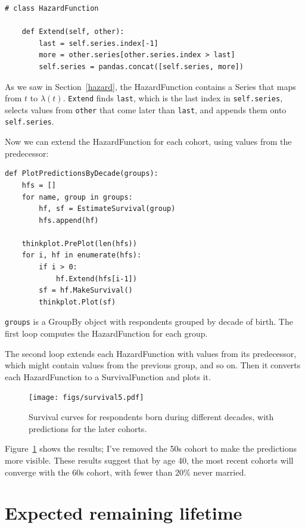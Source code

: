 \documentclass[12pt]{book}
\theoremstyle{exercise}
\begin{document}
\begin{verbatim}
# class HazardFunction

    def Extend(self, other):
        last = self.series.index[-1]
        more = other.series[other.series.index > last]
        self.series = pandas.concat([self.series, more])
\end{verbatim}

As we saw in Section~\ref{hazard}, the HazardFunction contains a Series
that maps from $t$ to $\lambda(t)$.  {\tt Extend} finds {\tt last},
which is the last index in {\tt self.series}, selects values from
{\tt other} that come later than {\tt last}, and appends them
onto {\tt self.series}.%
%

Now we can extend the HazardFunction for each cohort, using values
from the predecessor:

\begin{verbatim}
def PlotPredictionsByDecade(groups):
    hfs = []
    for name, group in groups:
        hf, sf = EstimateSurvival(group)
        hfs.append(hf)

    thinkplot.PrePlot(len(hfs))
    for i, hf in enumerate(hfs):
        if i > 0:
            hf.Extend(hfs[i-1])
        sf = hf.MakeSurvival()
        thinkplot.Plot(sf)
\end{verbatim}

{\tt groups} is a GroupBy object with respondents grouped by decade of
birth.  The first loop computes the HazardFunction for each group.%

The second loop extends each HazardFunction with values from
its predecessor, which might contain values from the previous
group, and so on.  Then it converts each HazardFunction to
a SurvivalFunction and plots it.

\begin{figure}
\centerline{\texttt{[image: figs/survival5.pdf]}}
\caption{Survival curves for respondents born during different decades,
with predictions for the later cohorts.}%
\label{survival5}
\end{figure}

Figure~\ref{survival5} shows the results; I've removed the 50s cohort
to make the predictions more visible.  These results suggest that by
age 40, the most recent cohorts will converge with the 60s cohort,
with fewer than 20\% never married.%


\section{Expected remaining lifetime}
\end{document}
